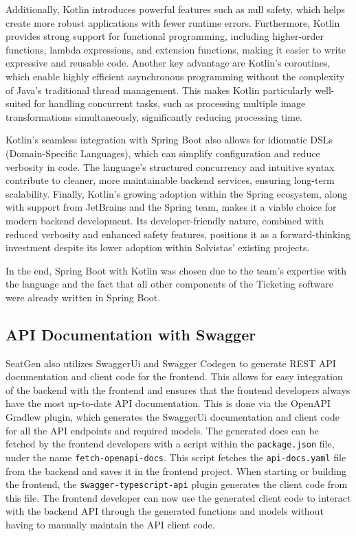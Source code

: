 Additionally, Kotlin introduces powerful features such as null safety, which helps create more robust applications with fewer runtime errors. Furthermore, Kotlin provides strong support for functional programming, including higher-order functions, lambda expressions, and extension functions, making it easier to write expressive and reusable code. Another key advantage are Kotlin’s coroutines, which enable highly efficient asynchronous programming without the complexity of Java’s traditional thread management. This makes Kotlin particularly well-suited for handling concurrent tasks, such as processing multiple image transformations simultaneously, significantly reducing processing time.

Kotlin’s seamless integration with Spring Boot also allows for idiomatic DSLs (Domain-Specific Languages), which can simplify configuration and reduce verbosity in code. The language’s structured concurrency and intuitive syntax contribute to cleaner, more maintainable backend services, ensuring long-term scalability. Finally, Kotlin’s growing adoption within the Spring ecosystem, along with support from JetBrains and the Spring team, makes it a viable choice for modern backend development. Its developer-friendly nature, combined with reduced verbosity and enhanced safety features, positions it as a forward-thinking investment despite its lower adoption within Solvistas' existing projects.

In the end, Spring Boot with Kotlin was chosen due to the team's expertise with the language and the fact that all other components of the Ticketing software were already written in Spring Boot.

\subsection{API Documentation with Swagger}
SeatGen also utilizes SwaggerUi and Swagger Codegen to generate REST API documentation and client code for the frontend. This allows for easy integration of the backend with the frontend and ensures that the frontend developers always have the most up-to-date API documentation. This is done via the OpenAPI Gradlew plugin, which generates the SwaggerUi documentation and client code for all the API endpoints and required models. The generated docs can be fetched by the frontend developers with a script within the \texttt{package.json} file, under the name \texttt{fetch-openapi-docs}. This script fetches the \texttt{api-docs.yaml} file from the backend and saves it in the frontend project. When starting or building the frontend, the \texttt{swagger-typescript-api} plugin generates the client code from this file. The frontend developer can now use the generated client code to interact with the backend API through the generated functions and models without having to manually maintain the API client code.


